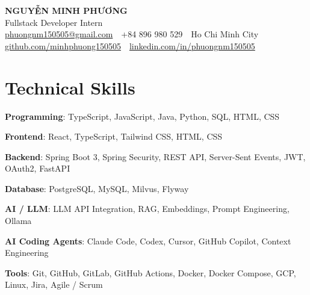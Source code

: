 \documentclass[10pt, a4paper]{article}
\newcommand{\skillrow}[2]{\textbf{#1}: #2\par}
\begin{document}
\color{BodyText}

\begin{center}
  {\fontsize{21pt}{25pt}\selectfont\bfseries\color{NavyBlue} NGUYỄN MINH PHƯƠNG}\\[3pt]
  {\fontsize{12.5pt}{15pt}\selectfont\color{MutedText} Fullstack Developer Intern}\\[4pt]
  {\footnotesize
  \href{mailto:phuongnm150505@gmail.com}{phuongnm150505@gmail.com}
  \,\textbar\, +84 896 980 529
  \,\textbar\, Ho Chi Minh City
  \,\textbar\, \href{https://github.com/minhphuong150505}{github.com/minhphuong150505}
  \,\textbar\, \href{https://www.linkedin.com/in/phuongnm150505/}{linkedin.com/in/phuongnm150505}}
\end{center}
\vspace{-6pt}

\section{Technical Skills}
\skillrow{Programming}{TypeScript, JavaScript, Java, Python, SQL, HTML, CSS}
\skillrow{Frontend}{React, TypeScript, Tailwind CSS, HTML, CSS}
\skillrow{Backend}{Spring Boot 3, Spring Security, REST API, Server-Sent Events, JWT, OAuth2, FastAPI}
\skillrow{Database}{PostgreSQL, MySQL, Milvus, Flyway}
\skillrow{AI / LLM}{LLM API Integration, RAG, Embeddings, Prompt Engineering, Ollama}
\skillrow{AI Coding Agents}{Claude Code, Codex, Cursor, GitHub Copilot, Context Engineering}
\skillrow{Tools}{Git, GitHub, GitLab, GitHub Actions, Docker, Docker Compose, GCP, Linux, Jira, Agile / Scrum}

\end{document}
